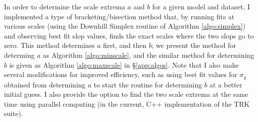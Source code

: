 In order to determine the scale extrema $a$ and $b$ for a given model and dataset, I implemented a type of bracketing/bisection method that, by running fits at various scales (using the Downhill Simplex routine of Algorithm \ref{algo:simplex}) and observing best fit slop values, finds the exact scales where the two slops go to zero. This method determines $a$ first, and then $b$; we present the method for determing $a$ as Algorithm \ref{algo:minscale}, and the similar method for determining $b$ is given as Algorithm \ref{algo:maxscale} in \S\ref{app:algos}. Note that I also make several modifications for improved efficiency, such as using best fit values for $\sigma_y$ obtained from determining $a$ to start the routine for determining $b$ at a better initial guess. I also provide the option to find the two scale extrema at the same time using parallel computing (in the current, C++ implementation of the TRK suite).
